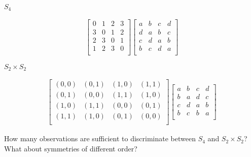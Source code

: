 $S_4$

 \begin{align*}
  \begin{bmatrix}
    0 & 1 & 2 & 3 \\
    3 & 0 & 1 & 2 \\
    2 & 3 & 0 & 1 \\
    1 & 2 & 3 & 0 \\
  \end{bmatrix}
  \begin{bmatrix}
    a & b & c & d \\
    d & a & b & c \\
    c & d & a & b \\
    b & c & d & a \\
  \end{bmatrix}
 \end{align*}

$S_2 \times S_2$

 \begin{align*}
  \begin{bmatrix}
    (0, 0) & (0, 1) & (1, 0) & (1, 1) \\
    (0, 1) & (0, 0) & (1, 1) & (1, 0) \\
    (1, 0) & (1, 1) & (0, 0) & (0, 1) \\
    (1, 1) & (1, 0) & (0, 1) & (0, 0) \\
  \end{bmatrix}
 \begin{bmatrix}
   a & b & c & d \\
   b & a & d & c \\
   c & d & a & b \\
   b & c & b & a \\
 \end{bmatrix}
 \end{align*}


How many observations are sufficient to discriminate between $S_4$ and $S_2\times S_2$?
What about symmetries of different order?
